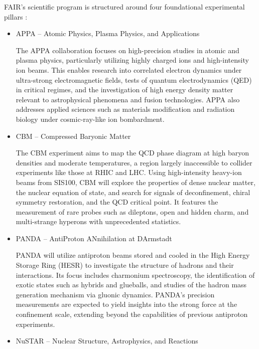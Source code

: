 \gls{FAIR}'s scientific program is structured around four foundational experimental pillars \cite{123_FAIR,rosner_future_2007,stoecker_fair_2011}:

\begin{itemize}
	\item APPA – Atomic Physics, Plasma Physics, and Applications \cite{APPA_2015}
	
	The APPA collaboration focuses on high-precision studies in atomic and plasma physics, particularly utilizing highly charged ions and high-intensity ion beams. This enables research into correlated electron dynamics under ultra-strong electromagnetic fields, tests of quantum electrodynamics (QED) in critical regimes, and the investigation of high energy density matter relevant to astrophysical phenomena and fusion technologies. APPA also addresses applied sciences such as materials modification and radiation biology under cosmic-ray-like ion bombardment.
	
	\item CBM – Compressed Baryonic Matter \cite{CBM_2023}
	
	The CBM experiment aims to map the QCD phase diagram at high baryon densities and moderate temperatures, a region largely inaccessible to collider experiments like those at RHIC and LHC. Using high-intensity heavy-ion beams from SIS100, CBM will explore the properties of dense nuclear matter, the nuclear equation of state, and search for signals of deconfinement, chiral symmetry restoration, and the QCD critical point. It features the measurement of rare probes such as dileptons, open and hidden charm, and multi-strange hyperons with unprecedented statistics.
	
	\item PANDA – AntiProton ANnihilation at DArmstadt \cite{PANDA_2013}
	
	PANDA will utilize antiproton beams stored and cooled in the High Energy Storage Ring (HESR) to investigate the structure of hadrons and their interactions. Its focus includes charmonium spectroscopy, the identification of exotic states such as hybrids and glueballs, and studies of the hadron mass generation mechanism via gluonic dynamics. PANDA's precision measurements are expected to yield insights into the strong force at the confinement scale, extending beyond the capabilities of previous antiproton experiments.
	
	\item NuSTAR – Nuclear Structure, Astrophysics, and Reactions \cite{NUSTAR_2015}
	

\end{itemize}
